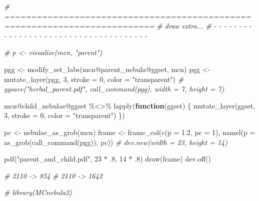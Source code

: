 \documentclass[
]{article}
\newenvironment{Shaded}{\begin{snugshade}}{\end{snugshade}}
\newcommand{\AttributeTok}[1]{\textcolor[rgb]{0.77,0.63,0.00}{#1}}
\newcommand{\CommentTok}[1]{\textcolor[rgb]{0.56,0.35,0.01}{\textit{#1}}}
\newcommand{\ControlFlowTok}[1]{\textcolor[rgb]{0.13,0.29,0.53}{\textbf{#1}}}
\newcommand{\DecValTok}[1]{\textcolor[rgb]{0.00,0.00,0.81}{#1}}
\newcommand{\FloatTok}[1]{\textcolor[rgb]{0.00,0.00,0.81}{#1}}
\newcommand{\FunctionTok}[1]{\textcolor[rgb]{0.00,0.00,0.00}{#1}}
\newcommand{\NormalTok}[1]{#1}
\newcommand{\OtherTok}[1]{\textcolor[rgb]{0.56,0.35,0.01}{#1}}
\newcommand{\SpecialCharTok}[1]{\textcolor[rgb]{0.00,0.00,0.00}{#1}}
\newcommand{\StringTok}[1]{\textcolor[rgb]{0.31,0.60,0.02}{#1}}
\begin{document}
\begin{Shaded}
\begin{Highlighting}[]
\CommentTok{\# ==========================================================================}
\CommentTok{\# draw extra...}
\CommentTok{\# {-} {-} {-} {-} {-} {-} {-} {-} {-} {-} {-} {-} {-} {-} {-} {-} {-} {-} {-} {-} {-} {-} {-} {-} {-} {-} {-} {-} {-} {-} {-} {-} {-} {-} {-} {-} {-}}

\CommentTok{\# p \textless{}{-} visualize(mcn, "parent")}

\NormalTok{pgg }\OtherTok{\textless{}{-}} \FunctionTok{modify\_set\_labs}\NormalTok{(mcn}\SpecialCharTok{@}\NormalTok{parent\_nebula}\SpecialCharTok{@}\NormalTok{ggset, mcn)}
\NormalTok{pgg }\OtherTok{\textless{}{-}} \FunctionTok{mutate\_layer}\NormalTok{(pgg, }\DecValTok{3}\NormalTok{, }\AttributeTok{stroke =} \DecValTok{0}\NormalTok{, }\AttributeTok{color =} \StringTok{"transparent"}\NormalTok{)}
\CommentTok{\# ggsave("herbal\_parent.pdf", call\_command(pgg), width = 7, height = 7)}

\NormalTok{mcn}\SpecialCharTok{@}\NormalTok{child\_nebulae}\SpecialCharTok{@}\NormalTok{ggset }\SpecialCharTok{\%\textless{}\textgreater{}\%}
  \FunctionTok{lapply}\NormalTok{(}\ControlFlowTok{function}\NormalTok{(ggset) \{}
    \FunctionTok{mutate\_layer}\NormalTok{(ggset, }\DecValTok{3}\NormalTok{, }\AttributeTok{stroke =} \DecValTok{0}\NormalTok{, }\AttributeTok{color =} \StringTok{"transparent"}\NormalTok{)}
\NormalTok{\})}

\NormalTok{pc }\OtherTok{\textless{}{-}} \FunctionTok{nebulae\_as\_grob}\NormalTok{(mcn)}
\NormalTok{frame }\OtherTok{\textless{}{-}} \FunctionTok{frame\_col}\NormalTok{(}\FunctionTok{c}\NormalTok{(}\AttributeTok{p =} \FloatTok{1.2}\NormalTok{, }\AttributeTok{pc =} \DecValTok{1}\NormalTok{), }\FunctionTok{namel}\NormalTok{(}\AttributeTok{p =} \FunctionTok{as\_grob}\NormalTok{(}\FunctionTok{call\_command}\NormalTok{(pgg)), pc))}
\CommentTok{\# dev.new(width = 23, height = 14)}

\FunctionTok{pdf}\NormalTok{(}\StringTok{"parent\_and\_child.pdf"}\NormalTok{, }\DecValTok{23} \SpecialCharTok{*}\NormalTok{ .}\DecValTok{8}\NormalTok{, }\DecValTok{14} \SpecialCharTok{*}\NormalTok{ .}\DecValTok{8}\NormalTok{)}
\FunctionTok{draw}\NormalTok{(frame)}
\FunctionTok{dev.off}\NormalTok{()}

\CommentTok{\# 2110 {-}\textgreater{} 854}
\CommentTok{\# 2110 {-}\textgreater{} 1642}

\CommentTok{\# library(MCnebula2)}


\end{Highlighting}
\end{Shaded}
\end{document}
